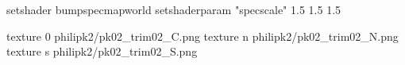 setshader bumpspecmapworld
setshaderparam "specscale" 1.5 1.5 1.5

texture 0 philipk2/pk02_trim02_C.png
texture n philipk2/pk02_trim02_N.png
texture s philipk2/pk02_trim02_S.png

